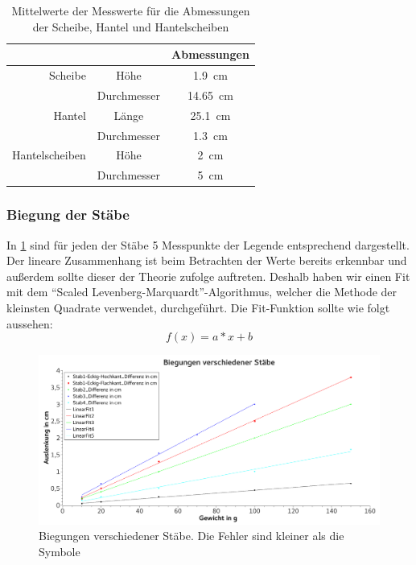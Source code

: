 \documentclass[
	a4paper,
	12pt,
	pagesize,
	ngerman
]{scrartcl}
\begin{document}
	\begin{table}[tb]
		\centering
		\begin{tabular}{ r | c | c |} 
			& & Abmessungen\\ \hline
			Scheibe & Höhe & \SI{1,9}{\centi \meter }\\
			& Durchmesser & \SI{14,65}{\centi \meter }\\ \hline
			Hantel & Länge & \SI{25,1}{\centi \meter }\\
			& Durchmesser & \SI{1,3}{\centi \meter }\\ \hline
			Hantelscheiben & Höhe & \SI{2}{\centi \meter } \\
			& Durchmesser & \SI{5}{\centi \meter }\\ \hline
		\end{tabular}
		\caption{Mittelwerte der Messwerte für die Abmessungen der Scheibe, Hantel und Hantelscheiben}
		\label{Abmessungen_Scheiben}
	\end{table}
	\subsubsection{Biegung der Stäbe}
	In \cref{BiegungGraph} sind für jeden der Stäbe 5 Messpunkte der Legende entsprechend dargestellt. Der lineare Zusammenhang ist beim Betrachten der Werte bereits erkennbar und außerdem sollte dieser der Theorie zufolge auftreten. Deshalb haben wir einen Fit mit dem \enquote{Scaled Levenberg-Marquardt}-Algorithmus, welcher die Methode der kleinsten Quadrate verwendet, durchgeführt. Die Fit-Funktion sollte wie folgt aussehen:
	\begin{equation}
		f(x)=a*x+b
	\end{equation}
	\begin{figure}[tb]
		\includegraphics[width=1\textwidth]{Biegungen}
		\centering
		\caption{Biegungen verschiedener Stäbe. Die Fehler sind kleiner als die Symbole}
		\label{BiegungGraph}
		\centering
	\end{figure}
\end{document}
